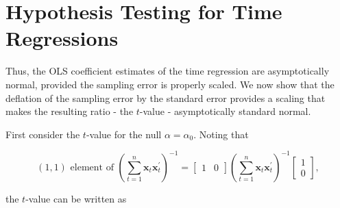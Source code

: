 \documentclass[10pt]{article}
\begin{document}
\section*{Hypothesis Testing for Time Regressions}
Thus, the OLS coefficient estimates of the time regression are asymptotically normal, provided the sampling error is properly scaled. We now show that the deflation of the sampling error by the standard error provides a scaling that makes the resulting ratio - the $t$-value - asymptotically standard normal.

First consider the $t$-value for the null $\alpha=\alpha_{0}$. Noting that

\[
(1,1) \text { element of }\left(\sum_{t=1}^{n} \mathbf{x}_{t} \mathbf{x}_{t}^{\prime}\right)^{-1}=\left[\begin{array}{ll}
1 & 0
\end{array}\right]\left(\sum_{t=1}^{n} \mathbf{x}_{t} \mathbf{x}_{t}^{\prime}\right)^{-1}\left[\begin{array}{l}
1  \tag{2.12.12}\\
0
\end{array}\right],
\]

the $t$-value can be written as
\end{document}
